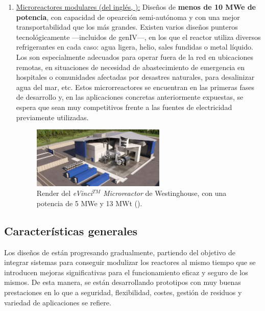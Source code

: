 \begin{enumerate}
\item \underline{Microreactores modulares (del inglés, ):} Diseños de \textbf{menos de 10 MWe de potencia}, con capacidad de opearción semi-autónoma y con una mejor transportabilidad que los  más grandes. Existen varios diseños punteros tecnológicamente ---incluidos de \acrshort{genIV}---, en los que el reactor utiliza diversos refrigerantes en cada caso: agua ligera, helio, sales fundidas o metal líquido. Los  son especialmente adecuados para operar fuera de la red en ubicaciones remotas, en situaciones de necesidad de abastecimiento de emergencia en hospitales o comunidades afectadas por desastres naturales, para desalinizar agua del mar, etc. Estos microrreactores se encuentran en las primeras fases de desarrollo y, en las aplicaciones concretas anteriormente expuestas, se espera que sean muy competitivos frente a las fuentes de electricidad previamente utilizadas.

\begin{figure}[h]
    \centering
    \includegraphics[width=0.6\textwidth]{content/figures/evinci.jpg}
    \caption{Render del \emph{eVinci$^{TM}$ Microreactor} de Westinghouse, con una potencia de 5 MWe y 13 MWt (\cite{evinci}).}
    \label{fig:evinci}
\end{figure}

\end{enumerate}

\subsection{Características generales}

Los diseños de  están progresando gradualmente, partiendo del objetivo de integrar sistemas para conseguir modulizar los reactores al mismo tiempo que se introducen mejoras significativas para el funcionamiento eficaz y seguro de los mismos. De esta manera, se están desarrollando prototipos con muy buenas prestaciones en lo que a seguridad, flexibilidad, costes, gestión de residuos y variedad de aplicaciones se refiere.

